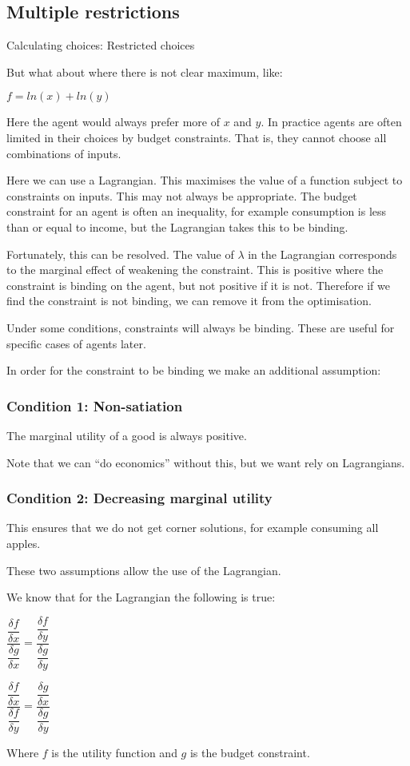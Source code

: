 
\subsection{Multiple restrictions}

Calculating choices: Restricted choices

But what about where there is not clear maximum, like:

\(f=ln(x)+ln(y)\)

Here the agent would always prefer more of \(x\) and \(y\). In practice agents are often limited in their choices by budget constraints. That is, they cannot choose all combinations of inputs.

Here we can use a Lagrangian. This maximises the value of a function subject to constraints on inputs. This may not always be appropriate. The budget constraint for an agent is often an inequality, for example consumption is less than or equal to income, but the Lagrangian takes this to be binding.

Fortunately, this can be resolved. The value of \(\lambda \) in the Lagrangian corresponds to the marginal effect of weakening the constraint. This is positive where the constraint is binding on the agent, but not positive if it is not. Therefore if we find the constraint is not binding, we can remove it from the optimisation.

Under some conditions, constraints will always be binding. These are useful for specific cases of agents later.

In order for the constraint to be binding we make an additional assumption:

\subsubsection{Condition 1: Non-satiation}

The marginal utility of a good is always positive.

Note that we can “do economics” without this, but we want rely on Lagrangians.

\subsubsection{Condition 2: Decreasing marginal utility}

This ensures that we do not get corner solutions, for example consuming all apples.

These two assumptions allow the use of the Lagrangian.

We know that for the Lagrangian the following is true:

\(\dfrac{\dfrac{\delta f}{\delta x}}{\dfrac{\delta g}{\delta x}}=\dfrac{\dfrac{\delta f}{\delta y}}{\dfrac{\delta g}{\delta y}}\)

\(\dfrac{\dfrac{\delta f}{\delta x}}{\dfrac{\delta f}{\delta y}}=\dfrac{\dfrac{\delta g}{\delta x}}{\dfrac{\delta g}{\delta y}}\)

Where \(f\) is the utility function and \(g\) is the budget constraint.

